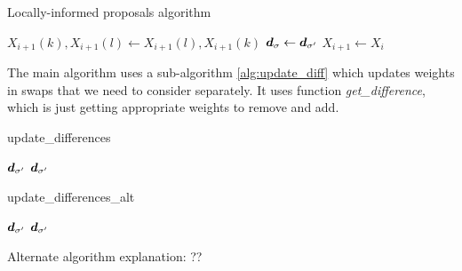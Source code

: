\begin{algorithm}[!htb]
	\caption{Locally-informed proposals algorithm}\label{alg:loc_neigh}
	\begin{algorithmic}[1]
		
			
			
			
				\State $X_{i+1}(k), X_{i+1}(l) \gets X_{i+1}(l), X_{i+1}(k)$
				\State $\bm{d}_{\sigma} \gets \bm{d}_{\sigma'}$
			\Else
				\State $X_{i+1} \gets X_i$
			\EndIf
		\EndFor
	\end{algorithmic}
\end{algorithm}
		
The main algorithm uses a sub-algorithm \ref{alg:update_diff} which updates weights in swaps that we need to consider separately. It uses function \textit{get\_difference}, which is just getting appropriate weights to remove and add. 
\begin{algorithm}[!htb]
	\caption{update\_differences}\label{alg:update_diff}
	\begin{algorithmic}[1]
		\Require $\bm{d}_{\sigma'}$
		\Ensure $\bm{d}_{\sigma'}$
				\EndIf
			\EndFor
		\EndFor
	\end{algorithmic}
\end{algorithm}

\begin{algorithm}[!htb]
	\caption{update\_differences\_alt}\label{alg:update_diff_alt}
	\begin{algorithmic}[1]
		\Require $\bm{d}_{\sigma'}$
		\Ensure $\bm{d}_{\sigma'}$
			\EndFor
		\EndFor
		
			\EndFor
		\EndFor
	\end{algorithmic}
\end{algorithm}
Alternate algorithm explanation: ??